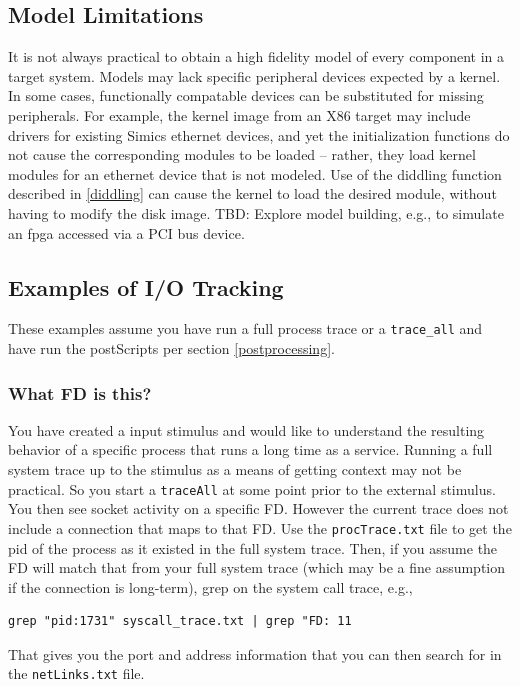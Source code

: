 \documentclass[titlepage]{article}
\begin{document}
\subsection{Model Limitations}
It is not always practical to obtain a high fidelity model of every component in a target system.  
Models may lack specific peripheral devices expected by a kernel.  In some cases, functionally
compatable devices can be substituted for missing peripherals.  For example, the kernel image from an
X86 target may include drivers for existing Simics ethernet devices, and yet the initialization functions
do not cause the corresponding modules to be loaded -- rather, they load kernel modules for an ethernet 
device that is not modeled.  Use of the diddling function described in \ref{diddling} can cause the kernel
to load the desired module, without having to modify the disk image.  
TBD: Explore model building, e.g., to simulate an fpga accessed via a PCI bus device.

\subsection{Examples of I/O Tracking}
These examples assume you have run a full process trace or a {\tt trace\_all} and have run the postScripts
per section \ref{postprocessing}.  

\subsubsection{What FD is this?}
You have created a input stimulus and would like to understand the resulting behavior of a specific process
that runs a long time as a service.
Running a full system trace up to the stimulus as a means of getting context may not be practical.  So you start
a {\tt traceAll} at some point prior to the external stimulus.  You then see socket activity on a specific FD.
However the current trace does not include a connection that maps to that FD.  Use the {\tt procTrace.txt}
file to get the pid of the process as it existed in the full system trace.  Then, if you assume the FD will match
that from your full system trace (which may be a fine assumption if the connection is long-term), grep on 
the system call trace, e.g.,
\begin{verbatim}
grep "pid:1731" syscall_trace.txt | grep "FD: 11
\end{verbatim}
That gives you the port and address information that you can then search for in the {\tt netLinks.txt} file.
\end{document}
